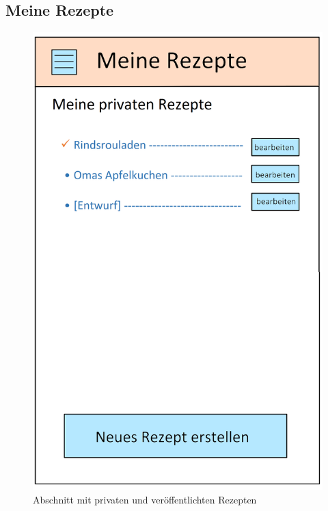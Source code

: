 \subsection{Meine Rezepte}

\begin{figure}[H]
	\begin{minipage}[c]{.5\textwidth} 
		\includegraphics[width=\textwidth]{gui/meine_rezepte.png}	
		\caption{Abschnitt mit privaten und veröffentlichten Rezepten}
		\label{rezeptliste}
	\end{minipage} \hspace{.7cm}
	\begin{minipage}[c]{.5\textwidth} 

\end{minipage}
\end{figure}
